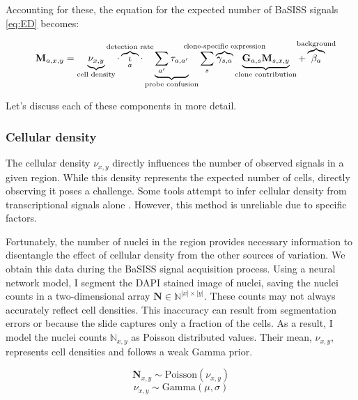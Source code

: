 Accounting for these, the equation for the expected number of \ac{BaSISS} signals \cref{eq:ED} becomes:

\begin{equation} 
\mathbf{M}_{a, x,y} = \underbrace{\nu_{x,y}}_{\text{cell density}} \cdot \overbrace{\iota}_a^{\mathclap{\text{detection rate}}} \cdot \underbrace{\sum_{a'} \tau_{a,a'}}_{\text{probe confusion}} \sum_s  \overbrace{\gamma_{s,a}}^{\mathclap{\text{clone-specific expression}}} \underbrace{\mathbf{G}_{a,s} \mathbf{M}_{s,x,y}}_{\text{clone contribution}} + \overbrace{\beta_a}^{\mathclap{\text{background}}}
\label{eq:ED_full}\\
\end{equation} 

Let's discuss each of these components in more detail.

\subsubsection*{Cellular density}
The cellular density $\nu_{x,y}$ directly influences the number of observed signals in a given region. While this density represents the expected number of cells, directly observing it poses a challenge. Some tools attempt to infer cellular density from transcriptional signals alone \parencite{Kleshchevnikov2022-ub}. However, this method is unreliable due to  specific factors.

Fortunately, the number of nuclei in the region provides necessary information to disentangle the effect of cellular density from the other sources of variation. We obtain this data during the \ac{BaSISS} signal acquisition process. Using a neural network model, I segment the DAPI stained image of nuclei, saving the nuclei counts in a two-dimensional array $\mathbf{N} \in \mathbb{N}^{|x| \times |y|}$. These counts may not always accurately reflect cell densities. This inaccuracy can result from segmentation errors or because the slide captures only a fraction of the cells. As a result, I model the nuclei counts $\mathbb{N}_{x,y}$ as Poisson distributed values. Their mean, $\nu_{x,y}$, represents cell densities and follows a weak Gamma prior.

\begin{equation}
    \mathbf{N}_{x,y} \sim \text{Poisson}({\nu}_{x,y})
\end{equation}
\begin{equation}
    {\nu}_{x,y} \sim \text{Gamma}(\mu, \sigma)
\end{equation}

